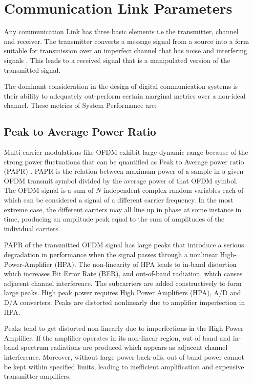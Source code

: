 \section{Communication Link Parameters}
 Any communication Link has three basic elements i.e the transmitter, channel and receiver. The
transmitter converts a message signal from a source into a form suitable for
transmission over an imperfect channel that has noise and interfering signals \cite{hayk}. This leads to a
received signal that is a manipulated version of the transmitted signal.
 
 The dominant consideration in the design of digital communication systems is their ability to adequately out-perform certain marginal metrics over a non-ideal channel. These metrics of System Performance are:

\subsection*{Peak to Average Power Ratio}
Multi carrier modulations like OFDM exhibit large dynamic range because of the strong power fluctuations that can be quantified as Peak to Average power ratio (PAPR) \cite{french}. PAPR is the relation between maximum power of a sample in a given OFDM transmit symbol divided by the average power of that OFDM symbol. The OFDM signal is a sum of $N$ independent complex random variables each of which can be considered a signal of a different carrier frequency. In the most extreme case, the different carriers may all line up in phase at some instance in time, producing an amplitude peak equal to the sum of amplitudes of the individual carriers.

PAPR of the transmitted OFDM signal has large peaks that introduce a serious degradation in performance when the signal passes through a nonlinear High-Power-Amplifier (HPA). The non-linearity of HPA leads to in-band distortion which increases Bit Error Rate (BER), and out-of-band radiation, which causes adjacent channel interference\cite{prob}.
The subcarriers are added constructively to form large peaks. High peak power requires High Power Amplifiers (HPA), A/D and D/A converters. Peaks are distorted nonlinearly due to amplifier imperfection in HPA. 

Peaks tend to get distorted non-linearly due to imperfections in the High Power Amplifier. If the amplifier operates in its non-linear region, out of band and in-band spectrum radiations are produced which appears as adjacent channel interference\cite{gaurav}. Moreover, without large power back-offs, out of band power cannot be kept within specified limits, leading to inefficient amplification and expensive transmitter amplifiers.
 
